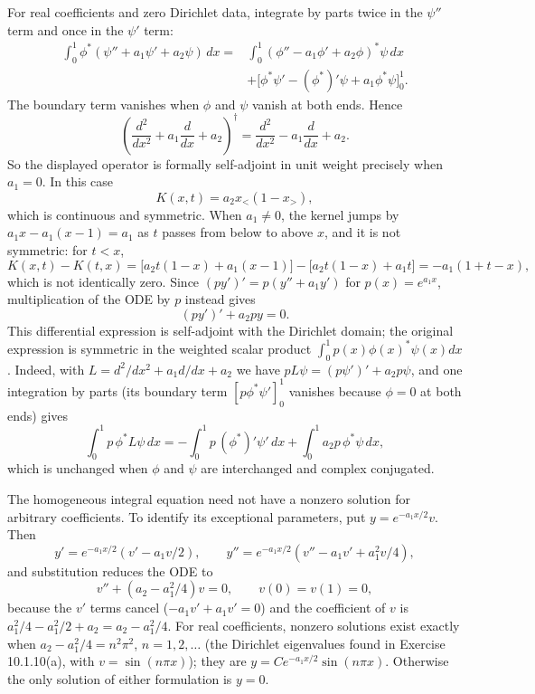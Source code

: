 For real coefficients and zero Dirichlet data, integrate by parts twice
in the $\psi''$ term and once in the $\psi'$ term:
\begin{align*}
\int_0^1\phi^*(\psi''+a_1\psi'+a_2\psi)\,dx
={}&\int_0^1(\phi''-a_1\phi'+a_2\phi)^*\psi\,dx\\
&+\bigl[\phi^*\psi'-(\phi^*)'\psi+a_1\phi^*\psi\bigr]_0^1.
\end{align*}
The boundary term vanishes when $\phi$ and $\psi$ vanish at both ends.
Hence
\[
\left(\frac{d^2}{dx^2}+a_1\frac d{dx}+a_2\right)^{\!\dagger}
=\frac{d^2}{dx^2}-a_1\frac d{dx}+a_2.
\]
So the displayed operator is formally self-adjoint in unit weight
precisely when $a_1=0$. In this case
\[
K(x,t)=a_2x_<(1-x_>),
\]
which is continuous and symmetric. When $a_1\ne0$, the kernel jumps by
$a_1x-a_1(x-1)=a_1$ as $t$ passes from below to above $x$, and it is
not symmetric: for $t<x$,
\[
K(x,t)-K(t,x)=\bigl[a_2t(1-x)+a_1(x-1)\bigr]-\bigl[a_2t(1-x)+a_1t\bigr]
=-a_1(1+t-x),
\]
which is not identically zero.
Since $(py')'=p(y''+a_1y')$ for $p(x)=e^{a_1x}$, multiplication of the
ODE by $p$ instead gives
\[
(py')'+a_2py=0.
\]
This differential expression is self-adjoint with the Dirichlet domain;
the original expression is symmetric in the weighted scalar product
$\int_0^1p(x)\phi(x)^*\psi(x)dx$. Indeed, with
$L=d^2/dx^2+a_1d/dx+a_2$ we have $pL\psi=(p\psi')'+a_2p\psi$, and one
integration by parts (its boundary term $[p\phi^*\psi']_0^1$ vanishes
because $\phi=0$ at both ends) gives
\[
\int_0^1p\,\phi^*L\psi\,dx
=-\int_0^1p\,(\phi^*)'\psi'\,dx+\int_0^1a_2p\,\phi^*\psi\,dx,
\]
which is unchanged when $\phi$ and $\psi$ are interchanged and
complex conjugated.

The homogeneous integral equation need not have a nonzero solution for
arbitrary coefficients. To identify its exceptional parameters, put
$y=e^{-a_1x/2}v$. Then
\[
y'=e^{-a_1x/2}(v'-a_1v/2),\qquad
y''=e^{-a_1x/2}(v''-a_1v'+a_1^2v/4),
\]
and substitution reduces the ODE to
\[
v''+(a_2-a_1^2/4)v=0,\qquad v(0)=v(1)=0,
\]
because the $v'$ terms cancel ($-a_1v'+a_1v'=0$) and the coefficient
of $v$ is $a_1^2/4-a_1^2/2+a_2=a_2-a_1^2/4$.
For real coefficients, nonzero solutions exist exactly when
$a_2-a_1^2/4=n^2\pi^2$, $n=1,2,\ldots$ (the Dirichlet eigenvalues
found in Exercise 10.1.10(a), with $v=\sin(n\pi x)$); they are
$y=C e^{-a_1x/2}\sin(n\pi x)$. Otherwise the only solution of either
formulation is $y=0$.


